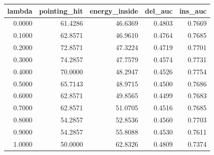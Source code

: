 \begin{tabular}{rrrrr}
\toprule
lambda & pointing_hit & energy_inside & del_auc & ins_auc \\
\midrule
0.0000 & 61.4286 & 46.6369 & 0.4803 & 0.7669 \\
0.1000 & 62.8571 & 46.9610 & 0.4764 & 0.7685 \\
0.2000 & 72.8571 & 47.3224 & 0.4719 & 0.7701 \\
0.3000 & 74.2857 & 47.7579 & 0.4574 & 0.7731 \\
0.4000 & 70.0000 & 48.2947 & 0.4526 & 0.7754 \\
0.5000 & 65.7143 & 48.9715 & 0.4500 & 0.7686 \\
0.6000 & 62.8571 & 49.8565 & 0.4499 & 0.7683 \\
0.7000 & 62.8571 & 51.0705 & 0.4516 & 0.7685 \\
0.8000 & 54.2857 & 52.8536 & 0.4560 & 0.7703 \\
0.9000 & 54.2857 & 55.8088 & 0.4530 & 0.7611 \\
1.0000 & 50.0000 & 62.8326 & 0.4809 & 0.7374 \\
\bottomrule
\end{tabular}
